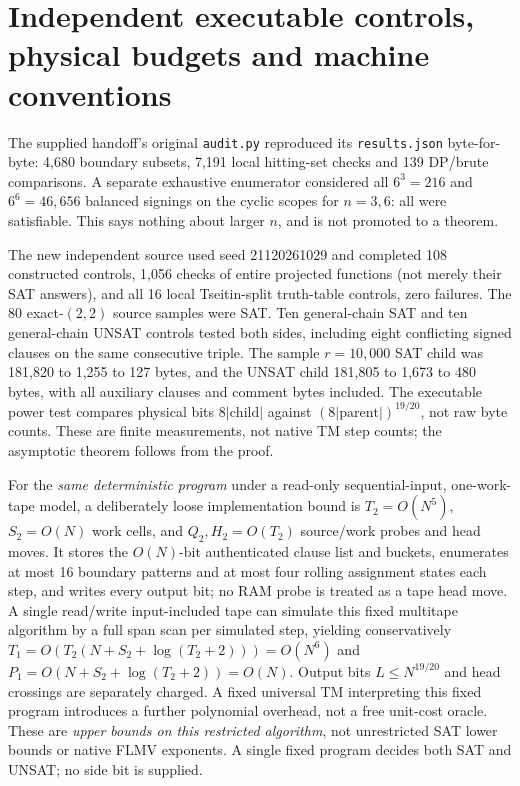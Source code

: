 \documentclass[11pt]{article}
\begin{document}
\section{Independent executable controls, physical budgets and machine conventions}
The supplied handoff's original \texttt{audit.py} reproduced its \texttt{results.json} byte-for-byte: 4,680 boundary subsets, 7,191 local hitting-set checks and 139 DP/brute comparisons. A separate exhaustive enumerator considered all $6^3=216$ and $6^6=46{,}656$ balanced signings on the cyclic scopes for $n=3,6$: all were satisfiable. This says nothing about larger $n$, and is not promoted to a theorem.

The new independent source  used seed 21120261029 and completed 108 constructed controls, 1,056 checks of entire projected functions (not merely their SAT answers), and all 16 local Tseitin-split truth-table controls, zero failures. The 80 exact-$(2,2)$ source samples were SAT. Ten general-chain SAT and ten general-chain UNSAT controls tested both sides, including eight conflicting signed clauses on the same consecutive triple. The sample $r=10{,}000$ SAT child was 181,820 to 1,255 to 127 bytes, and the UNSAT child 181,805 to 1,673 to 480 bytes, with all auxiliary clauses and comment bytes included. The executable power test compares physical bits $8|\mathrm{child}|$ against $(8|\mathrm{parent}|)^{19/20}$, not raw byte counts. These are finite measurements, not native TM step counts; the asymptotic theorem follows from the proof.

For the \emph{same deterministic program} under a read-only sequential-input, one-work-tape model, a deliberately loose implementation bound is $T_2=O(N^5)$, $S_2=O(N)$ work cells, and $Q_2,H_2=O(T_2)$ source/work probes and head moves. It stores the $O(N)$-bit authenticated clause list and buckets, enumerates at most 16 boundary patterns and at most four rolling assignment states each step, and writes every output bit; no RAM probe is treated as a tape head move. A single read/write input-included tape can simulate this fixed multitape algorithm by a full span scan per simulated step, yielding conservatively $T_1=O(T_2(N+S_2+\log(T_2+2)))=O(N^6)$ and $P_1=O(N+S_2+\log(T_2+2))=O(N)$. Output bits $L\le N^{19/20}$ and head crossings are separately charged. A fixed universal TM interpreting this fixed program introduces a further polynomial overhead, not a free unit-cost oracle. These are \emph{upper bounds on this restricted algorithm}, not unrestricted SAT lower bounds or native FLMV exponents. A single fixed program decides both SAT and UNSAT; no side bit is supplied.
\end{document}
